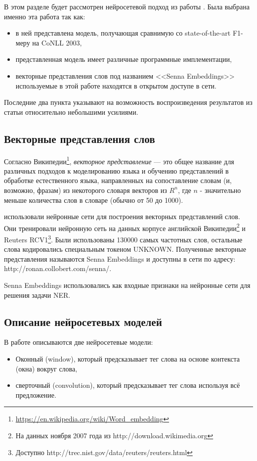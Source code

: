   В этом разделе будет рассмотрен нейросетевой подход из работы
  \citep{collobert2011natural}. Была выбрана именно эта работа так как:
  \begin{itemize}
  \item в ней представлена модель, получающая сравнимую со state-of-the-art F1-меру на CoNLL 2003,
  \item представленная модель имеет различные программные имплементации,
  \item векторные представления слов под названием <<Senna Embeddings>>
    используемые в этой работе находятся в открытом доступе в сети.
  \end{itemize}
  Последние два пункта указывают на возможность воспроизведения результатов из статьи относительно небольшими усилиями.

  \subsection{Векторные представления слов}

  Согласно Википедии\footnote{\url{https://en.wikipedia.org/wiki/Word_embedding}},
  \textit{векторное представление} — это общее название для различных
  подходов к моделированию языка и обучению представлений в обработке естественного языка,
  направленных на сопоставление словам (и, возможно, фразам) из некоторого словаря
  векторов из $R^n$, где $n$ - значительно меньше количества слов в словаре (обычно от 50 до 1000).

  \citep{collobert2011natural} использовали нейронные сети для построения векторных представлений слов.
  Они тренировали нейронную сеть на данных корпусе английской
  Википедии\footnote{На данных ноября 2007 года из http://download.wikimedia.org}
  и Reuters RCV1\footnote{Доступно http://trec.nist.gov/data/reuters/reuters.html}.
  Были использованы 130000 самых частотных слов, остальные слова кодировались
  специальным токеном UNKNOWN.
  Полученные векторные представления называются Senna Embeddings и доступны в сети
  по адресу: http://ronan.collobert.com/senna/.

  Senna Embeddings использовались как входные признаки на нейронные сети для решения задачи NER.

  \subsection{Описание нейросетевых моделей}

  В работе \citep{collobert2011natural} описываются две нейросетевые модели:
  \begin{itemize}
  \item Оконный (window), который предсказывает тег слова на основе контекста (окна) вокруг слова,
  \item сверточный (convolution), который предсказывает тег слова используя всё предложение.
  \end{itemize}

